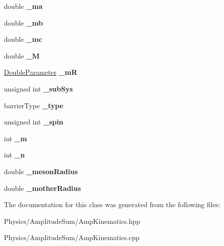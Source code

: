 \begin{DoxyCompactItemize}
\item 
\hypertarget{class_amp_kinematics_a553f0abd52487ebc9f8b24507f8740dc}{double {\bfseries \-\_\-ma}}\label{class_amp_kinematics_a553f0abd52487ebc9f8b24507f8740dc}

\item 
\hypertarget{class_amp_kinematics_a3d17adaa41f63445c49adeb8ed8dac67}{double {\bfseries \-\_\-mb}}\label{class_amp_kinematics_a3d17adaa41f63445c49adeb8ed8dac67}

\item 
\hypertarget{class_amp_kinematics_ac989c429c4f0b1dffbeae94bdb0eb81a}{double {\bfseries \-\_\-mc}}\label{class_amp_kinematics_ac989c429c4f0b1dffbeae94bdb0eb81a}

\item 
\hypertarget{class_amp_kinematics_ac49fdd54e3125426bfefe2ef306c3db2}{double {\bfseries \-\_\-\-M}}\label{class_amp_kinematics_ac49fdd54e3125426bfefe2ef306c3db2}

\item 
\hypertarget{class_amp_kinematics_a14e84c28d4b76bda8eb76e8f3b0cb7d2}{\hyperlink{class_double_parameter}{Double\-Parameter} {\bfseries \-\_\-m\-R}}\label{class_amp_kinematics_a14e84c28d4b76bda8eb76e8f3b0cb7d2}

\item 
\hypertarget{class_amp_kinematics_a0f9ab4462eb9db5b8b547c8812c00f2e}{unsigned int {\bfseries \-\_\-sub\-Sys}}\label{class_amp_kinematics_a0f9ab4462eb9db5b8b547c8812c00f2e}

\item 
\hypertarget{class_amp_kinematics_abbe3e35cdd1f671fb144edeabe29e4b4}{barrier\-Type {\bfseries \-\_\-type}}\label{class_amp_kinematics_abbe3e35cdd1f671fb144edeabe29e4b4}

\item 
\hypertarget{class_amp_kinematics_ac3b0b6eea54c34fa35b79a92a83f7ca8}{unsigned int {\bfseries \-\_\-spin}}\label{class_amp_kinematics_ac3b0b6eea54c34fa35b79a92a83f7ca8}

\item 
\hypertarget{class_amp_kinematics_a20a737f64ee1ffd92bc269ec7e6b96de}{int {\bfseries \-\_\-m}}\label{class_amp_kinematics_a20a737f64ee1ffd92bc269ec7e6b96de}

\item 
\hypertarget{class_amp_kinematics_aa308f032c192789e61f3a34bdbd0a24e}{int {\bfseries \-\_\-n}}\label{class_amp_kinematics_aa308f032c192789e61f3a34bdbd0a24e}

\item 
\hypertarget{class_amp_kinematics_afe00771f3356a103d52897c7f1614688}{double {\bfseries \-\_\-meson\-Radius}}\label{class_amp_kinematics_afe00771f3356a103d52897c7f1614688}

\item 
\hypertarget{class_amp_kinematics_a5d7a7d7e365172074f799704cf3c8eb9}{double {\bfseries \-\_\-mother\-Radius}}\label{class_amp_kinematics_a5d7a7d7e365172074f799704cf3c8eb9}

\end{DoxyCompactItemize}


The documentation for this class was generated from the following files\-:\begin{DoxyCompactItemize}
\item 
Physics/\-Amplitude\-Sum/Amp\-Kinematics.\-hpp\item 
Physics/\-Amplitude\-Sum/Amp\-Kinematics.\-cpp\end{DoxyCompactItemize}
